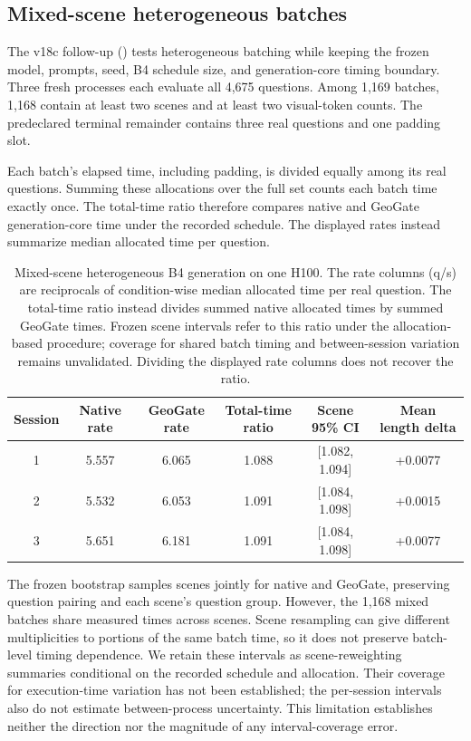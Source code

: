\subsection{Mixed-scene heterogeneous batches}
The v18c follow-up () tests heterogeneous batching while keeping the frozen model, prompts, seed, B4 schedule size, and generation-core timing boundary. Three fresh processes each evaluate all 4,675 questions. Among 1,169 batches, 1,168 contain at least two scenes and at least two visual-token counts. The predeclared terminal remainder contains three real questions and one padding slot.

Each batch's elapsed time, including padding, is divided equally among its real questions. Summing these allocations over the full set counts each batch time exactly once. The total-time ratio therefore compares native and GeoGate generation-core time under the recorded schedule. The displayed rates instead summarize median allocated time per question.

\begin{table}[t]
\centering
\caption{Mixed-scene heterogeneous B4 generation on one H100. The rate columns (q/s) are reciprocals of condition-wise median allocated time per real question. The total-time ratio instead divides summed native allocated times by summed GeoGate times. Frozen scene intervals refer to this ratio under the allocation-based procedure; coverage for shared batch timing and between-session variation remains unvalidated. Dividing the displayed rate columns does not recover the ratio.}
\label{tab:supp_hetero_batch}
\begin{tabular}{cccccc}
\toprule
Session & Native rate & GeoGate rate & Total-time ratio & Scene 95\% CI & Mean length delta \\
\midrule
1 & 5.557 & 6.065 & 1.088 & [1.082, 1.094] & +0.0077 \\
2 & 5.532 & 6.053 & 1.091 & [1.084, 1.098] & +0.0015 \\
3 & 5.651 & 6.181 & 1.091 & [1.084, 1.098] & +0.0077 \\
\bottomrule
\end{tabular}
\end{table}

The frozen bootstrap samples scenes jointly for native and GeoGate, preserving question pairing and each scene's question group. However, the 1,168 mixed batches share measured times across scenes. Scene resampling can give different multiplicities to portions of the same batch time, so it does not preserve batch-level timing dependence. We retain these intervals as scene-reweighting summaries conditional on the recorded schedule and allocation. Their coverage for execution-time variation has not been established; the per-session intervals also do not estimate between-process uncertainty. This limitation establishes neither the direction nor the magnitude of any interval-coverage error.

